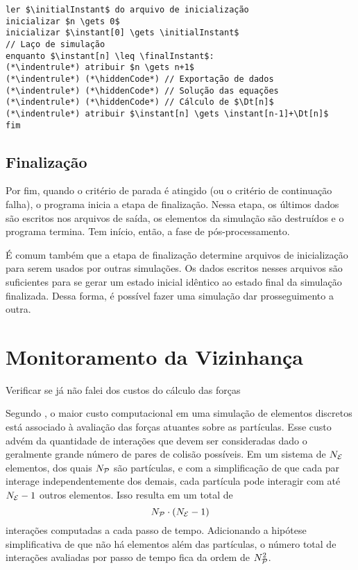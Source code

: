 \begin{lstlisting}[float, floatplacement=h, language=pseudocode, label=lst:stop_criterion, caption=Pseudocódigo para a condição de parada do laço da simulação.]
ler $\initialInstant$ do arquivo de inicialização
inicializar $n \gets 0$
inicializar $\instant[0] \gets \initialInstant$
// Laço de simulação 
enquanto $\instant[n] \leq \finalInstant$:
(*\indentrule*)	atribuir $n \gets n+1$
(*\indentrule*)	(*\hiddenCode*) // Exportação de dados
(*\indentrule*)	(*\hiddenCode*) // Solução das equações
(*\indentrule*)	(*\hiddenCode*) // Cálculo de $\Dt[n]$
(*\indentrule*)	atribuir $\instant[n] \gets \instant[n-1]+\Dt[n]$
fim
\end{lstlisting}

\subsection{Finalização}

Por fim, quando o critério de parada é atingido (ou o critério de continuação falha), o programa inicia a etapa de finalização. Nessa etapa, os últimos dados são escritos nos arquivos de saída, os elementos da simulação são destruídos e o programa termina. Tem início, então, a fase de pós-processamento.

É comum também que a etapa de finalização determine arquivos de inicialização para serem usados por outras simulações. Os dados escritos nesses arquivos são suficientes para se gerar um estado inicial idêntico ao estado final da simulação finalizada. Dessa forma, é possível fazer uma simulação dar prosseguimento a outra.

\section{Monitoramento da Vizinhança} \label{sec:neighborhood}
\alert{Verificar se já não falei dos custos do cálculo das forças} 

Segundo , o maior custo computacional em uma simulação de elementos discretos está associado à avaliação das forças atuantes sobre as partículas. Esse custo advém da quantidade de interações que devem ser consideradas dado o geralmente grande número de pares de colisão possíveis. Em um sistema de \(N_{\mathcal{E}}\) elementos, dos quais \(N_{\mathcal{P}}\) são partículas, e com a simplificação de que cada par interage independentemente dos demais, cada partícula pode interagir com até \(N_{\mathcal{E}}-1\) outros elementos. Isso resulta em um total de
\begin{equation*}
	\numberOfParticles\cdot\pqty{\numberOfElements-1}
\end{equation*}
interações computadas a cada passo de tempo. Adicionando a hipótese simplificativa de que não há elementos além das partículas, o número total de interações avaliadas por passo de tempo fica da ordem de \(N_{\mathcal{P}}^2\).


